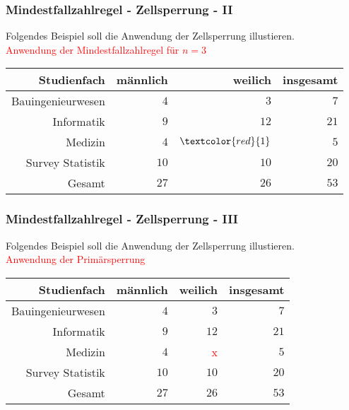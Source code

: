 \documentclass[aspectratio=169]{beamer}
\begin{document}
\begin{frame}
    \frametitle{Mindestfallzahlregel - Zellsperrung - II}
    Folgendes Beispiel soll die Anwendung der Zellsperrung illustieren. \\
    \textcolor{red}{Anwendung der Mindestfallzahlregel für $n = 3$}
    \begin{center}
        \begin{tabular}{ r r r r }
         \textbf{Studienfach} \vline & \textbf{männlich} & \textbf{weilich} & \textbf{insgesamt} \\ 
         \hline
         Bauingenieurwesen \vline & $4$ & $3$ & $7$ \\
         Informatik \vline & $9$ & $12$ & $21$ \\  
         Medizin \vline & $4$ & $\textcolor{red}{1}$ & $5$ \\
         Survey Statistik \vline & $10$ & $10$ & $20$ \\
         \hline
         Gesamt \vline & $27$ & $26$ & $53$
        \end{tabular}
    \end{center}
\end{frame}


\begin{frame}
    \frametitle{Mindestfallzahlregel - Zellsperrung - III}
    Folgendes Beispiel soll die Anwendung der Zellsperrung illustieren. \\
    \textcolor{red}{Anwendung der Primärsperrung}
    \begin{center}
        \begin{tabular}{ r r r r }
         \textbf{Studienfach} \vline & \textbf{männlich} & \textbf{weilich} & \textbf{insgesamt} \\ 
         \hline
         Bauingenieurwesen \vline & $4$ & $3$ & $7$ \\
         Informatik \vline & $9$ & $12$ & $21$ \\  
         Medizin \vline & $4$ & \textcolor{red}{x} & $5$ \\
         Survey Statistik \vline & $10$ & $10$ & $20$ \\
         \hline
         Gesamt \vline & $27$ & $26$ & $53$
        \end{tabular}
    \end{center}
\end{frame}
\end{document}
